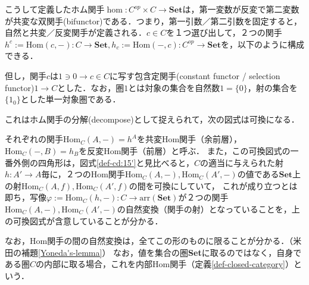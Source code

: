 \documentclass[uplatex, 12pt, dvipdfmx]{jsreport}
\begin{document}
こうして定義したホム関手$\hom:C^{op}\times C\to \mathbf{Set}$は，第一変数が反変で第二変数が共変な双関手(bifunctor)である．つまり，第一引数／第二引数を固定すると，自然と共変／反変関手が定義される．$c\in C$を１つ選び出して，２つの関手$h^c:=\mathrm{Hom}(c,-):C\to\mathbf{Set},h_c:=\mathrm{Hom}(-,c):C^{op}\to\mathbf{Set}$を，以下のように構成できる．
\begin{center}\end{center}
但し，関手$c$は$1\ni 0\to c\in C$に写す包含定関手(constant functor / selection functor)$1\to C$とした．なお，圏$1$とは対象の集合を自然数$1=\{ 0\}$，射の集合を$\{ 1_0\}$とした単一対象圏である．

これはホム関手の分解(decompose)として捉えられて，次の図式は可換になる．
\begin{center}\end{center}
それぞれの関手$\mathrm{Hom}_C(A,-)=h^A$を共変Hom関手（余前層），$\mathrm{Hom}_C(-,B)=h_B$を反変Hom関手（前層）と呼ぶ．
また，この可換図式の一番外側の四角形は，図式\ref{def-cd:15'}と見比べると，$C$の適当に与えられた射$h:A'\to A$毎に，２つのHom関手$\mathrm{Hom}_C(A,-),\mathrm{Hom}_C(A',-)$の値である$\mathbf{Set}$上の射$\mathrm{Hom}_C(A,f),\mathrm{Hom}_C(A',f)$の間を可換にしていて，
これが成り立つとは即ち，写像$\varphi := \mathrm{Hom}_C(h,-):C\to \mathrm{arr}(\mathbf{Set})$が２つの関手$\mathrm{Hom}_C(A,-),\mathrm{Hom}_C(A',-)$の自然変換（関手の射）となっていることを，上の可換図式が含意していることが分かる．

なお，Hom関手の間の自然変換は，全てこの形のものに限ることが分かる．（米田の補題\ref{Yoneda's-lemma}）
なお，値を集合の圏\textbf{Set}に取るのではなく，自身である圏$C$の内部に取る場合，これを内部Hom関手（定義\ref{def-closed-category}）という．
\end{document}
